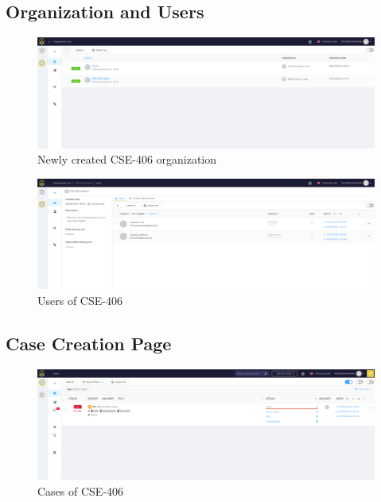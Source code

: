 \documentclass{book}
\begin{document}
\subsection{Organization and Users}
\begin{figure}[h]
    \centering
    \includegraphics[width=.8\linewidth]{Case_images/Case Demo/Organizations.png}
    \caption{Newly created CSE-406 organization}
    \label{fig:organization}
\end{figure}
\bigskip
\bigskip
\begin{figure}[h]
    \centering
    \includegraphics[width=.8\linewidth]{Case_images/Case Demo/users.png}
    \caption{Users of CSE-406}
    \label{fig:users_of_organization}
\end{figure}
\bigskip
\bigskip

\subsection{Case Creation Page}
\begin{figure}[h]
    \centering
    \includegraphics[width=.8\linewidth]{Case_images/Case Demo/CaseCreationpage.png}
    \caption{Cases of CSE-406}
    \label{fig:cases_of_organization}
\end{figure}
\newpage
\end{document}
